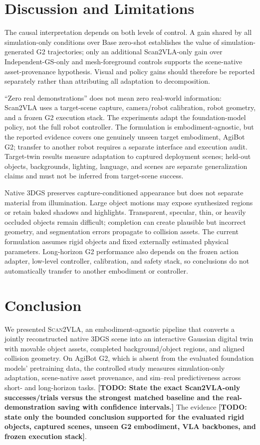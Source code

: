 \documentclass[letterpaper,10pt,conference]{ieeeconf}
\newcommand{\system}{\textsc{Scan2VLA}}
\newcommand{\todo}[1]{\textbf{[TODO: #1]}}
\begin{document}
\section{Discussion and Limitations}
\label{sec:limitations}
The causal interpretation depends on both levels of control. A gain shared by
all simulation-only conditions over Base zero-shot establishes the value of
simulation-generated G2 trajectories; only an additional Scan2VLA-only gain over
Independent-GS-only and mesh-foreground controls supports the scene-native
asset-provenance hypothesis. Visual and policy gains should therefore be
reported separately rather than attributing all adaptation to decomposition.

``Zero real demonstrations'' does not mean zero real-world information: Scan2VLA
uses a target-scene capture, camera/robot calibration, robot geometry, and a
frozen G2 execution stack. The experiments adapt the foundation-model policy, not
the full robot controller. The formulation is embodiment-agnostic, but the
reported evidence covers one genuinely unseen target embodiment, AgiBot G2;
transfer to another robot requires a separate interface and execution audit.
Target-twin results measure adaptation to captured deployment scenes; held-out
objects, backgrounds, lighting, language, and scenes are separate generalization
claims and must not be inferred from target-scene success.

Native 3DGS preserves capture-conditioned appearance but does not separate
material from illumination. Large object motions may expose synthesized regions
or retain baked shadows and highlights. Transparent, specular, thin, or heavily
occluded objects remain difficult; completion can create plausible but incorrect
geometry, and segmentation errors propagate to collision assets. The current
formulation assumes rigid objects and fixed externally estimated physical
parameters. Long-horizon G2 performance also depends on the frozen action
adapter, low-level controller, calibration, and safety stack, so conclusions do
not automatically transfer to another embodiment or controller.

\section{Conclusion}
\label{sec:conclusion}
We presented \system, an embodiment-agnostic pipeline that converts a jointly
reconstructed native 3DGS scene into an interactive Gaussian digital twin with
movable object assets, completed background/object regions, and aligned collision
geometry. On AgiBot G2, which is absent from the evaluated foundation models'
pretraining data, the controlled study measures simulation-only adaptation,
scene-native asset provenance, and sim--real predictiveness across short- and
long-horizon tasks. \todo{State the exact Scan2VLA-only successes/trials versus
the strongest matched baseline and the real-demonstration saving with confidence
intervals.} The evidence \todo{state only the bounded conclusion supported for
the evaluated rigid objects, captured scenes, unseen G2 embodiment, VLA
backbones, and frozen execution stack}.
\end{document}
